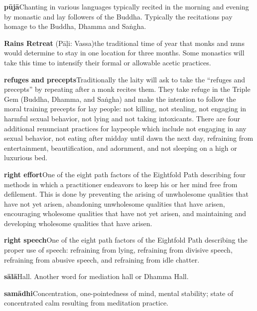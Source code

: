 {\textbf{pūjā}\hspace{\glosskip}Chanting in various languages typically recited in the 
morning and evening by monastic and lay followers of the Buddha. 
Typically the recitations pay homage to the Buddha, Dhamma and Saṅgha.

\textbf{Rains Retreat} (Pāḷi: Vassa)\hspace{\glosskip}the traditional time of year 
that monks and nuns would determine to stay in one location for three 
months. Some monastics will take this time to intensify their formal or 
allowable acetic practices.

\textbf{refuges and precepts}\hspace{\glosskip}Traditionally the laity will ask to take 
the ``refuges and precepts'' by repeating after a monk recites them. 
They take refuge in the Triple Gem (Buddha, Dhamma, and Saṅgha) and 
make the intention to follow the moral training precepts for lay 
people: not killing, not stealing, not engaging in harmful sexual 
behavior, not lying and not taking intoxicants. There are four 
additional renunciant practices for laypeople which include not 
engaging in any sexual behavior, not eating after midday until dawn the 
next day, refraining from entertainment, beautification, and adornment, 
and not sleeping on a high or luxurious bed.

\textbf{right effort}\hspace{\glosskip}One of the eight path factors of the Eightfold 
Path describing four methods in which a practitioner endeavors to keep 
his or her mind free from defilement. This is done by preventing the 
arising of unwholesome qualities that have not yet arisen, abandoning 
unwholesome qualities that have arisen, encouraging wholesome qualities 
that have not yet arisen, and maintaining and developing wholesome 
qualities that have arisen.

\textbf{right speech}\hspace{\glosskip}One of the eight path factors of the Eightfold 
Path describing the proper use of speech: refraining from lying, 
refraining from divisive speech, refraining from abusive speech, and 
refraining from idle chatter.

\textbf{sālā}\hspace{\glosskip}Hall. Another word for mediation hall or Dhamma Hall.

\textbf{samādhi}\hspace{\glosskip}Concentration, one-pointedness of mind, mental 
stability; state of concentrated calm resulting from meditation 
practice.

}
